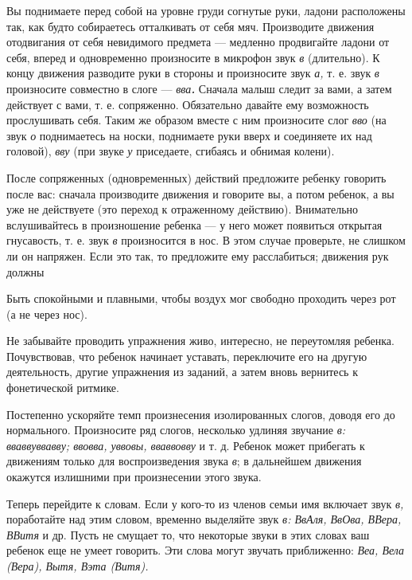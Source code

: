 \documentclass{book}
\renewcommand{\emph}[1]{\textit{#1}}
\begin{document}
Вы поднимаете перед собой на уровне груди согнутые руки, ладони
расположены так, как будто собираетесь отталкивать от себя мяч.
Производите движения отодвигания от себя невидимого предмета ---
медленно продвигайте ладони от себя, вперед и одновременно произносите в
микрофон звук \emph{в} (длительно). К концу движения разводите руки в
стороны и произносите звук \emph{а,} т. е. звук \emph{в} произносите
совместно в слоге --- \emph{вва\textbf{. }}Сначала малыш следит за вами,
а затем действует с вами, т. е. сопряженно. Обязательно давайте ему
возможность прослушивать себя. Таким же образом вместе с ним произносите
слог \emph{вво} (на звук \emph{о} поднимаетесь на носки, поднимаете руки
вверх и соединяете их над головой), \emph{вву} (при звуке \emph{у}
приседаете, сгибаясь и обнимая колени).

После сопряженных (одновременных) действий предложите ребенку говорить
после вас: сначала производите движения и говорите вы, а потом ребенок,
а вы уже не действуете (это переход к отраженному действию). Внимательно
вслушивайтесь в произношение ребенка --- у него может появиться открытая
гнусавость, т. е. звук \emph{в} произносится в нос. В этом случае
проверьте, не слишком ли он напряжен. Если это так, то предложите ему
расслабиться; движения рук должны

Быть спокойными и плавными, чтобы воздух мог свободно проходить через
рот (а не через нос).

Не забывайте проводить упражнения живо, интересно, не переутомляя
ребенка. Почувствовав, что ребенок начинает уставать, переключите его на
другую деятельность, другие упражнения из заданий, а затем вновь
вернитесь к фонетической ритмике.

Постепенно ускоряйте темп произнесения изолированных слогов, доводя его
до нормального. Произносите ряд слогов, несколько удлиняя звучание
\emph{в: вваввуввавву; ввовва, уввовы, вваввовву} и т. д. Ребенок может
прибегать к движениям только для воспроизведения звука \emph{в}; в
дальнейшем движения окажутся излишними при произнесении этого звука.

Теперь перейдите к словам. Если у кого-то из членов семьи имя включает
звук \emph{в,} поработайте над этим словом, временно выделяйте звук
\emph{в: ВвАля, ВвОва, ВВера, ВВитя} и др. Пусть не смущает то, что
некоторые звуки в этих словах ваш ребенок еще не умеет говорить. Эти
слова могут звучать приближенно: \emph{Веа, Вела (Вера), Вытя, Вэта
(Витя).}
\end{document}
